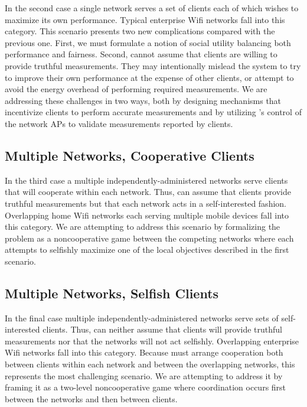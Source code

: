 In the second case a single network serves a set of clients each of which
wishes to maximize its own performance. Typical enterprise Wifi networks fall
into this category. This scenario presents two new complications compared
with the previous one. First, we must formulate a notion of social utility
balancing both performance and fairness. Second, \PS{} cannot assume that
clients are willing to provide truthful measurements. They may intentionally
mislead the system to try to improve their own performance at the expense of
other clients, or attempt to avoid the energy overhead of performing required
measurements. We are addressing these challenges in two ways, both by
designing mechanisms that incentivize clients to perform accurate
measurements and by utilizing \PS{}'s control of the network APs to validate
measurements reported by clients.

\subsection{Multiple Networks, Cooperative Clients}

In the third case a multiple independently-administered networks serve
clients that will cooperate within each network. Thus, \PS{} can assume that
clients provide truthful measurements but that each network acts in a
self-interested fashion. Overlapping home Wifi networks each serving multiple
mobile devices fall into this category. We are attempting to address this
scenario by formalizing the problem as a noncooperative game between the
competing networks where each attempts to selfishly maximize one of the local
objectives described in the first scenario.

\subsection{Multiple Networks, Selfish Clients}

In the final case multiple independently-administered networks serve sets of
self-interested clients. Thus, \PS{} can neither assume that clients will
provide truthful measurements nor that the networks will not act selfishly.
Overlapping enterprise Wifi networks fall into this category. Because \PS{}
must arrange cooperation both between clients within each network and between
the overlapping networks, this represents the most challenging scenario. We
are attempting to address it by framing it as a two-level noncooperative game
where coordination occurs first between the networks and then between
clients.
